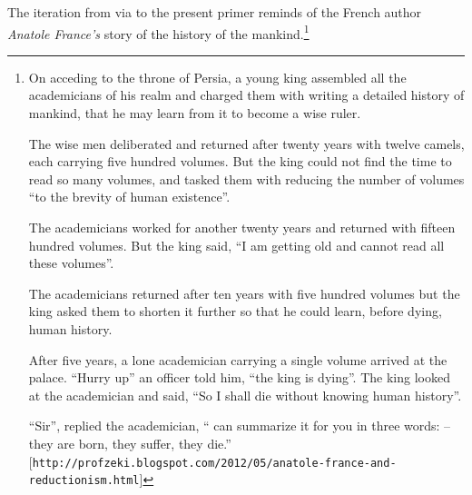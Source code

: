 {%
\pind The iteration from \cite{TheSEBook3} via
      \cite{Kiev:2010ptI,Kiev:2010ptII,BjornerFAoC2015MDAAD,BjornerTOSEM2018,BjornerMonograph2020}
      to the present primer 
      reminds  of the French author \textsl{Anatole France's} story of the
      history of the  mankind.\footnote{%
On acceding to the throne of Persia, a young king assembled all the
academicians of his realm and charged them with writing a detailed
history of mankind, that he may learn from it to become a wise ruler. 

The wise men deliberated and returned after twenty years with twelve
camels, each carrying five hundred volumes. But the king could not
find the time to read so many volumes, and tasked them with reducing
the number of volumes ``to the brevity of human existence''. 

The academicians worked for another twenty years and returned with
fifteen hundred volumes. But the king said, ``I am getting old and
cannot read all these volumes''. 

The academicians returned after ten years with five hundred volumes
but the king asked them to shorten it further so that he could learn,
before dying, human history. 

After five years, a lone academician carrying a single volume arrived
at the palace. ``Hurry up''\ysfchgii{, } an officer told him, ``the king is
dying''. The king looked at the academician and said, ``So I shall die
without knowing human history''. 

``Sir'', replied the academician, `` can summarize it for you in three
words: – they are born, they suffer, they die.'' [\texttt{http://profzeki.blogspot.com/2012/05/anatole-france-and-reductionism.html}]
}%
\afslut
\afslut
\afslut


}
